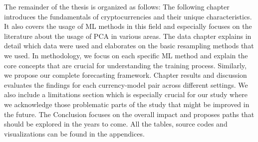 The remainder of the thesis is organized as follows: 
The following chapter introduces the fundamentals of cryptocurrencies and their unique characteristics.
It also covers the usage of \ac{ML} methods in this field and especially focuses on the literature about
the usage of \ac{PCA} in various areas. The data chapter explains in detail which data were used 
and elaborates on the basic resampling methods that we used. In methodology, we focus on each specific
\ac{ML} method and explain the core concepts that are crucial for understanding the training process. 
Similarly, we propose our complete forecasting framework. Chapter results and discussion evaluates
the findings for each currency-model pair across different settings. We also include a limitations
section which is especially crucial for our study where we acknowledge those problematic parts of the study 
that might be improved in the future. The Conclusion focuses on the overall impact and proposes
paths that should be explored in the years to come. All the tables, source codes and visualizations
can be found in the appendices.
